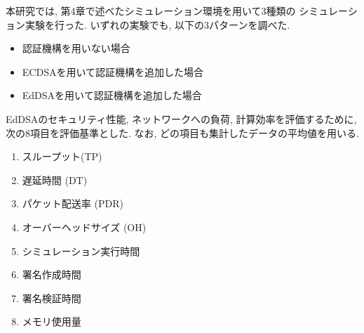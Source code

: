 本研究では, 第4章で述べたシミュレーション環境を用いて3種類の
シミュレーション実験を行った. いずれの実験でも, 以下の3パターンを調べた. 
\begin{itemize}
  \item 認証機構を用いない場合
  \item ECDSAを用いて認証機構を追加した場合
  \item EdDSAを用いて認証機構を追加した場合
\end{itemize}

EdDSAのセキュリティ性能, ネットワークへの負荷, 計算効率を評価するために, 
次の8項目を評価基準とした. なお, どの項目も集計したデータの平均値を用いる.  
\vspace{-3mm}
\setlength{\columnsep}{10pt} %
\begin{multicols}{2}
  \begin{enumerate}
      \item スループット(TP)
      \item 遅延時間 (DT) 
      \item パケット配送率 (PDR)
      \item オーバーヘッドサイズ (OH)\\
      \item シミュレーション実行時間
      \item 署名作成時間
      \item 署名検証時間
      \item メモリ使用量
  \end{enumerate}
\end{multicols}
